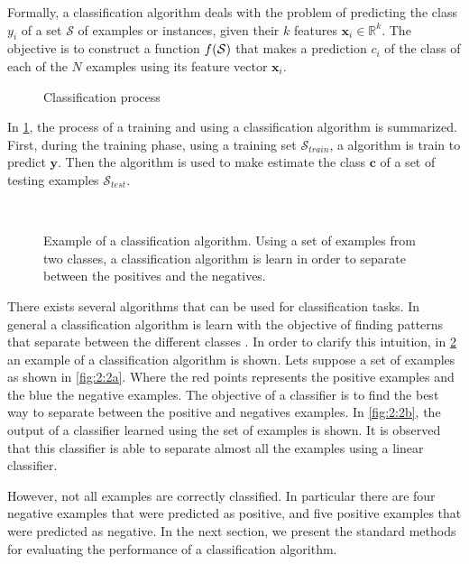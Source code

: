 Formally, a classification algorithm deals with the problem	of predicting the class $y_i$ of a 
set $\mathcal{S}$ of examples or instances, given their $k$ features \mbox{$\mathbf{x}_i \in 
\mathbb{R}^k$}. The objective is to construct a function $f(\cal{S})$ that makes a prediction 
$c_i$ of the class of each of the $N$ examples using its feature vector $\mathbf{x}_i$.
\label{ntn:ch2:1}

\begin{figure}
	\centering
	
  \caption{Classification process}
  \label{fig:2:1}
\end{figure}

In \figurename{ \ref{fig:2:1}}, the process of a training and using a classification algorithm is 
summarized. First, during the training phase, using a training set $\mathcal{S}_{train}$, a 
algorithm is train to predict $\mathbf{y}$. Then the algorithm is used to make estimate the class 
$\mathbf{c}$ of a set of testing examples $\mathcal{S}_{test}$.

\begin{figure}[!t]
\centering
{}
\\
\caption{Example of a classification algorithm. Using a set of examples from two classes, a 
	classification algorithm is learn in order to separate between the positives and the negatives. }
\label{fig:2:2}
\end{figure} 

There exists several algorithms that can be used for classification tasks. In general a 
classification algorithm is learn with the objective of finding patterns that separate between the 
different classes \citep{Hastie2009}. In order to clarify this intuition, in \figurename{ 
\ref{fig:2:2}} an example of a classification algorithm is shown. Lets suppose a set of examples as 
shown in \figurename{ \ref{fig:2:2a}}.  Where the red points represents the positive examples and 
the blue the negative examples. The objective of a classifier is to find the best way to separate 
between the positive and negatives examples. In \figurename{ \ref{fig:2:2b}}, the output of a 
classifier learned using the set of examples is shown. It is observed that this classifier is able 
to separate almost all the examples using a linear classifier. 

However, not all examples are correctly classified. In particular there are four negative examples 
that were predicted as positive, and five positive examples that were predicted as negative. In the 
next section, we present the standard methods for evaluating the performance of a classification 
algorithm.

